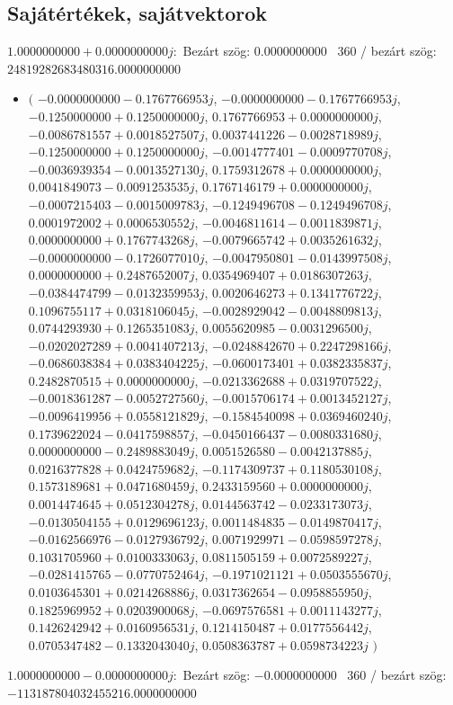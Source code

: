 \documentclass[14pt,a4paper]{article}
\begin{document}
\subsection{Sajátértékek, sajátvektorok}
$1.0000000000+0.0000000000j$:\
Bezárt szög: $0.0000000000$ \
360 / bezárt szög: $24819282683480316.0000000000$\
\begin{itemize}
\item
$\big($
$-0.0000000000-0.1767766953j$, $-0.0000000000-0.1767766953j$, $-0.1250000000+0.1250000000j$, $0.1767766953+0.0000000000j$, $-0.0086781557+0.0018527507j$, $0.0037441226-0.0028718989j$, $-0.1250000000+0.1250000000j$, $-0.0014777401-0.0009770708j$, $-0.0036939354-0.0013527130j$, $0.1759312678+0.0000000000j$, $0.0041849073-0.0091253535j$, $0.1767146179+0.0000000000j$, $-0.0007215403-0.0015009783j$, $-0.1249496708-0.1249496708j$, $0.0001972002+0.0006530552j$, $-0.0046811614-0.0011839871j$, $0.0000000000+0.1767743268j$, $-0.0079665742+0.0035261632j$, $-0.0000000000-0.1726077010j$, $-0.0047950801-0.0143997508j$, $0.0000000000+0.2487652007j$, $0.0354969407+0.0186307263j$, $-0.0384474799-0.0132359953j$, $0.0020646273+0.1341776722j$, $0.1096755117+0.0318106045j$, $-0.0028929042-0.0048809813j$, $0.0744293930+0.1265351083j$, $0.0055620985-0.0031296500j$, $-0.0202027289+0.0041407213j$, $-0.0248842670+0.2247298166j$, $-0.0686038384+0.0383404225j$, $-0.0600173401+0.0382335837j$, $0.2482870515+0.0000000000j$, $-0.0213362688+0.0319707522j$, $-0.0018361287-0.0052727560j$, $-0.0015706174+0.0013452127j$, $-0.0096419956+0.0558121829j$, $-0.1584540098+0.0369460240j$, $0.1739622024-0.0417598857j$, $-0.0450166437-0.0080331680j$, $0.0000000000-0.2489883049j$, $0.0051526580-0.0042137885j$, $0.0216377828+0.0424759682j$, $-0.1174309737+0.1180530108j$, $0.1573189681+0.0471680459j$, $0.2433159560+0.0000000000j$, $0.0014474645+0.0512304278j$, $0.0144563742-0.0233173073j$, $-0.0130504155+0.0129696123j$, $0.0011484835-0.0149870417j$, $-0.0162566976-0.0127936792j$, $0.0071929971-0.0598597278j$, $0.1031705960+0.0100333063j$, $0.0811505159+0.0072589227j$, $-0.0281415765-0.0770752464j$, $-0.1971021121+0.0503555670j$, $0.0103645301+0.0214268886j$, $0.0317362654-0.0958855950j$, $0.1825969952+0.0203900068j$, $-0.0697576581+0.0011143277j$, $0.1426242942+0.0160956531j$, $0.1214150487+0.0177556442j$, $0.0705347482-0.1332043040j$, $0.0508363787+0.0598734223j$
$\big)$
\end{itemize}
$1.0000000000-0.0000000000j$:\
Bezárt szög: $-0.0000000000$ \
360 / bezárt szög: $-113187804032455216.0000000000$\
\end{document}

